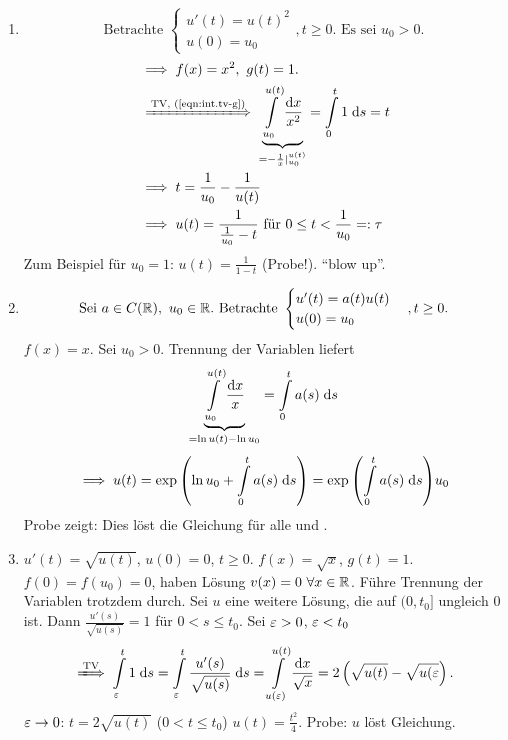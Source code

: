 \documentclass[12pt]{scrreprt}
\begin{document}
\begin{bsp}
  \label{bsp:int.tv}
  \begin{enumerate}
  \item \[\text{Betrachte } \begin{cases}
      u'(t)=u(t)^2\\u(0)=u_0 \end{cases} , t \ge 0. \text{ Es sei }
    u_0>0.\]
    \begin{align*}
      &\folgt f(x)=x^2,\ g(t)=1.\\
      &\folgtnach{TV, (\ref{eqn:int.tv-g})}
      \underbrace{\int\limits_{u_0}^{u(t)}{\frac{\mathrm{d}x}{x^2}}}_{=-\frac1x|_{u_0}^{u(t)}} =
      \Integral{0}{t}{1}{s} = t\\
      &\folgt t = \frac{1}{u_0}-\frac{1}{u(t)}\\
      &\folgt u(t) = \frac{1}{\frac{1}{u_0}-t} \text{ für } 0\le t<
      \frac{1}{u_0} =: \tau
    \end{align*}
    Zum Beispiel für $u_0=1$: $u(t)=\frac{1}{1-t}$ (Probe!). "`blow
    up"'.
  \item \[\text{Sei } a\in C(\mathbb{R}),\
    u_0\in\mathbb{R}. \text{ Betrachte } \begin{cases} u'(t) = a(t)u(t)\\
      u(0)=u_0 \end{cases}, t\ge0. \]
    \folgt $f(x)=x$. Sei $u_0>0$. Trennung der Variablen liefert
    \[\underbrace{\int\limits_{u_0}^{u(t)}{\frac{\mathrm{d}x}{x}}}_
    {=\ln{u(t)}-\ln{u_0}} = \int\limits_{0}^{t}{a(s)}\;\mathrm{d}s\]
    \[\implies u(t)=\exp{\left(\ln{u_0}+\ensuremath{\int\limits_{0}^{t}{a(s)}\;\mathrm{d}s}\right)}
    = \exp{\left(\ensuremath{\int\limits_{0}^{t}{a(s)}\;\mathrm{d}s}\right)}u_0\]
    Probe zeigt: Dies löst die Gleichung für alle  und
    .
  \item $u'(t)=\sqrt{u(t)}$, $u(0)=0$, $t\ge0$. \folgt
    $f(x)=\sqrt{x}$, $g(t)=1$. \folgt $f(0)=f(u_0)=0$, haben Lösung
    $v(x)=0\ \forall x\in\mathbb{R}$. Führe Trennung der Variablen trotzdem
    durch. Sei $u$ eine weitere Lösung, die auf $(0,t_0]$ ungleich $0$
    ist. Dann $\frac{u'(s)}{\sqrt{u(s)}}=1$ für $0<s\le t_0$. Sei
    $\varepsilon>0$, $\varepsilon<t_0$
    \[\folgtnach{TV} \Integral{\ep}{t}{1}{s} =
    \Integral{\ep}{t}{\frac{u'(s)}{\sqrt{u(s)}}}{s} =
    \int\limits_{u(\ep)}^{u(t)}{\frac{\mathrm{d}x}{\sqrt{x}}} =
    2\left(\sqrt{u(t)}-\sqrt{u(\ep}\right).\]
    $\varepsilon\to0$: $t=2\sqrt{u(t)}$ ($0<t\le t_0$) \folgt
    $u(t)=\frac{t^2}{4}$. Probe: $u$ löst Gleichung.
  \end{enumerate}
\end{bsp}
\end{document}

